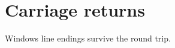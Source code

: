 \documentclass{article}
\begin{document}
\section{Carriage returns}
Windows line endings %
survive the round trip.

\end{document}

